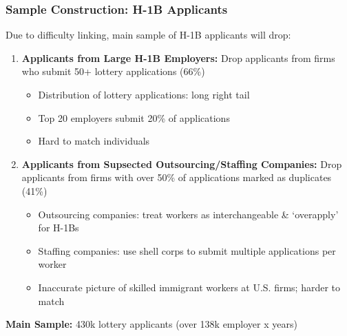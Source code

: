 \documentclass[xcolor=dvipsnames, compress, 12pt, aspectratio=169, handout]{beamer}
\begin{document}
    
    

    


\begin{frame}\label{firm_sample}
    \frametitle{Sample Construction: H-1B Applicants}
    Due to difficulty linking, main sample of H-1B applicants will drop:
    \vspace{2mm}
    \begin{enumerate}
        \item \textbf{Applicants from Large H-1B Employers:} Drop applicants from firms who submit 50+ lottery applications (66\%)
        \begin{itemize}
            \item Distribution of lottery applications: long right tail \hyperlink{app_hist_binned}{} 
            \item Top 20 employers submit 20\% of applications 
            \item Hard to match individuals
        \end{itemize}
        \vspace{2mm}
        \item \textbf{Applicants from Supsected Outsourcing/Staffing Companies:} Drop applicants from firms with over 50\% of applications marked as duplicates (41\%)
        \begin{itemize}
            \item Outsourcing companies: treat workers as interchangeable \& `overapply' for H-1Bs
            \item Staffing companies: use shell corps to submit multiple applications per worker
            \item Inaccurate picture of skilled immigrant workers at U.S. firms; harder to match
        \end{itemize}
    \end{enumerate}
    \vspace{2mm}
    \textbf{Main Sample:} 430k lottery applicants (over 138k employer x years)
\end{frame}
\end{document}
